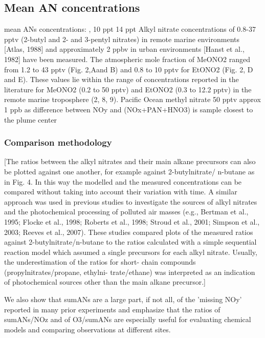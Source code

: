 \documentclass[11pt,a4paper]{article}
\begin{document}
\subsection{Mean AN concentrations}
mean ANs concentrations: \citep{Reeves2007}, 10 ppt \citep{Roberts1998} 14 ppt
\citep{Atherton1989}
Alkyl nitrate concentrations of 0.8-37 pptv (2-butyl and 2- and 3-pentyl nitrates) in remote marine environments [Atlas, 1988] and approximately 2 ppbv in urban environments [Hanst et al., 1982] have been measured.
\citep{Chuck2002}
The atmospheric mole fraction of MeONO2 ranged from 1.2 to 43 pptv (Fig. 2,Aand B) and 0.8 to 10 pptv for EtONO2 (Fig. 2, D and E). These values lie within the range of concentrations reported in the literature for MeONO2 (0.2 to 50 pptv) and EtONO2 (0.3 to 12.2 pptv) in the remote marine troposphere (2, 8, 9).
\citep{Blake2003}
Pacific Ocean methyl nitrate 50 pptv
\citep{Neuman2012}
approx 1 ppb as difference between NOy and (NOx+PAN+HNO3) is sample closest to the plume center

\subsubsection{Comparison methodology}
\citep{Sommariva2008}
[The ratios between the alkyl nitrates and their
main alkane precursors can also be plotted against one another, for example against 2-butylnitrate/ n-butane as in Fig. 4. In this way the modelled and the measured concentrations can be compared without taking into account their variation with time. A similar approach was used in previous studies to investigate the sources of alkyl nitrates and the photochemical processing of polluted air masses (e.g., Bertman et al., 1995; Flocke et al., 1998; Roberts et al., 1998; Stroud et al., 2001; Simpson et al., 2003; Reeves et al., 2007). These studies compared plots of the measured ratios against 2-butylnitrate/n-butane to the ratios calculated with a simple sequential reaction model which assumed a single precursors for each alkyl nitrate. Usually, the underestimation of the ratios for short- chain compounds (propylnitrates/propane, ethylni- trate/ethane) was interpreted as an indication of photochemical sources other than the main alkane precursor.]

\citep{Day2003}
We also show that sumANs are a large part, if not all, of the 'missing NOy' reported in many prior experiments and emphasize that the ratios of sumANs/NOz and of O3/sumANs are especially useful for evaluating chemical models and comparing observations at different sites.
\end{document}
